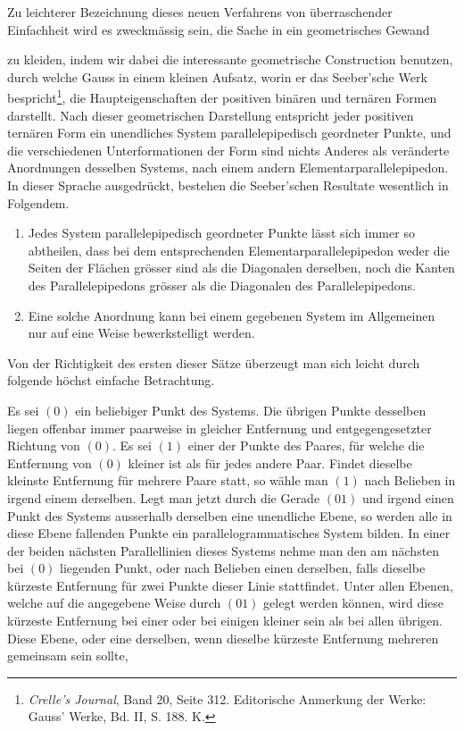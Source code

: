 \documentclass[11pt]{article}
\begin{document}
Zu leichterer Bezeichnung dieses neuen Verfahrens von überraschender Einfachheit wird es zweckmässig sein, die Sache in ein geometrisches Gewand

zu kleiden, indem wir dabei die interessante geometrische Construction benutzen, durch welche Gauss in einem kleinen Aufsatz, worin er das Seeber'sche Werk bespricht\footnote{\emph{Crelle's Journal}, Band 20, Seite 312. Editorische Anmerkung der Werke: Gauss' Werke, Bd. II, S. 188. K.}, die Haupteigenschaften der positiven binären und ternären Formen darstellt. Nach dieser geometrischen Darstellung entspricht jeder positiven ternären Form ein unendliches System parallelepipedisch geordneter Punkte, und die verschiedenen Unterformationen der Form sind nichts Anderes als veränderte Anordnungen desselben Systems, nach einem andern Elementarparallelepipedon. In dieser Sprache ausgedrückt, bestehen die Seeber'schen Resultate wesentlich in Folgendem.

\begin{enumerate}
\item Jedes System parallelepipedisch geordneter Punkte lässt sich immer so abtheilen, dass bei dem entsprechenden Elementarparallelepipedon weder die Seiten der Flächen grösser sind als die Diagonalen derselben, noch die Kanten des Parallelepipedons grösser als die Diagonalen des Parallelepipedons.
\item Eine solche Anordnung kann bei einem gegebenen System im Allgemeinen nur auf eine Weise bewerkstelligt werden.
\end{enumerate}

Von der Richtigkeit des ersten dieser Sätze überzeugt man sich leicht durch folgende höchst einfache Betrachtung.

Es sei $(0)$ ein beliebiger Punkt des Systems. Die übrigen Punkte desselben liegen offenbar immer paarweise in gleicher Entfernung und entgegengesetzter Richtung von $(0)$. Es sei $(1)$ einer der Punkte des Paares, für welche die Entfernung von $(0)$ kleiner ist als für jedes andere Paar. Findet dieselbe kleinste Entfernung für mehrere Paare statt, so wähle man $(1)$ nach Belieben in irgend einem derselben. Legt man jetzt durch die Gerade $(01)$ und irgend einen Punkt des Systems ausserhalb derselben eine unendliche Ebene, so werden alle in diese Ebene fallenden Punkte ein parallelogrammatisches System bilden. In einer der beiden nächsten Parallellinien dieses Systems nehme man den am nächsten bei $(0)$ liegenden Punkt, oder nach Belieben einen derselben, falls dieselbe kürzeste Entfernung für zwei Punkte dieser Linie stattfindet. Unter allen Ebenen, welche auf die angegebene Weise durch $(01)$ gelegt werden können, wird diese kürzeste Entfernung bei einer oder bei einigen kleiner sein als bei allen übrigen. Diese Ebene, oder eine derselben, wenn dieselbe kürzeste Entfernung mehreren gemeinsam sein sollte,
\end{document}
